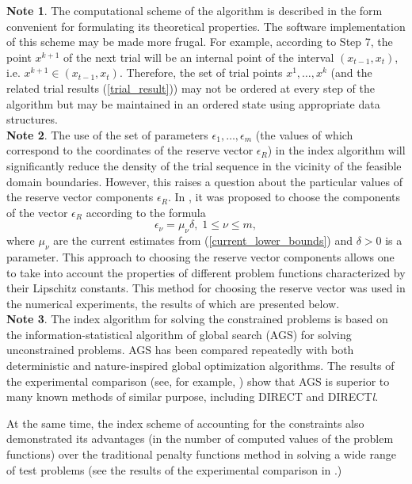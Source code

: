 \documentclass[twocolumn]{svjour3}          %
\begin{document}
\textbf{Note 1}. The computational scheme of the algorithm is described in the form convenient for  formulating its theoretical properties. The software implementation of this scheme may be made more frugal. For example, according to Step 7, the point $x^{k+1}$ of the next trial will be an internal point of the interval $(x_{t-1}, x_t)$, i.e. $x^{k+1} \in (x_{t-1}, x_t)$. Therefore, the set of trial points $x^1,\ldots, x^k$ (and the related trial results (\ref{trial_result})) may not be ordered  at every step of the algorithm but may be maintained in an ordered state using appropriate data structures.
\\
\textbf{Note 2}. The use of the set of parameters $\epsilon_1,\ldots,\epsilon_m$ (the values of which correspond to the coordinates of the reserve vector $\epsilon_R$) in the index algorithm will significantly reduce the density of the trial sequence in the vicinity of the feasible domain boundaries. However, this raises a question about the particular values of the reserve vector components $\epsilon_R$. In \cite{Strongin2000}, it was proposed to choose the components of the vector $\epsilon_R$ according to the formula 
\begin{equation}\label{epsilon_nu}
	\epsilon_{\nu} = \mu_{\nu}\delta, \; 1 \leq \nu \leq m, 
\end{equation}
where $\mu_{\nu}$ are the current estimates from (\ref{current_lower_bounds}) and $\delta>0$ is a parameter. This approach to choosing the reserve vector components allows one to take into account the properties of different problem functions characterized by their Lipschitz constants. This method for choosing the reserve vector was used in the numerical experiments, the results of which are presented below.
\\
\textbf{Note 3}. The index algorithm for solving the constrained problems is based on the information-statistical algorithm of global search (AGS) for solving unconstrained problems. AGS has been compared repeatedly with both deterministic and nature-inspired global optimization algorithms. The results of the experimental comparison (see, for example, \cite{Sovrasov2019}) show that AGS is superior to many known methods of similar purpose, including DIRECT and DIRECT\textit{l}.

	At the same time, the index scheme of accounting for the constraints also demonstrated its advantages (in the number of computed values of the problem functions) over the traditional penalty functions method in solving a wide range of test problems (see the results of the experimental comparison in \cite{Barkalov2017_1,Barkalov2017_2}.)
\end{document}

